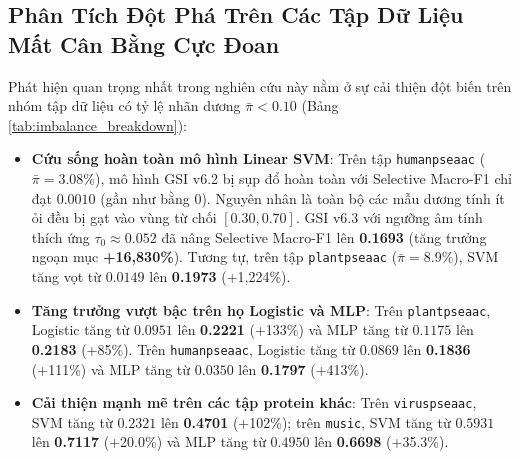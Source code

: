 \documentclass[10pt,a4paper,twoside]{article}
\begin{document}
\subsection{Phân Tích Đột Phá Trên Các Tập Dữ Liệu Mất Cân Bằng Cực Đoan}
Phát hiện quan trọng nhất trong nghiên cứu này nằm ở sự cải thiện đột biến trên nhóm tập dữ liệu có tỷ lệ nhãn dương $\bar{\pi} < 0.10$ (Bảng \ref{tab:imbalance_breakdown}):
\begin{itemize}
    \item \textbf{Cứu sống hoàn toàn mô hình Linear SVM}: Trên tập \texttt{humanpseaac} ($\bar{\pi} = 3.08\%$), mô hình GSI v6.2 bị sụp đổ hoàn toàn với Selective Macro-F1 chỉ đạt $0.0010$ (gần như bằng 0). Nguyên nhân là toàn bộ các mẫu dương tính ít ỏi đều bị gạt vào vùng từ chối $[0.30, 0.70]$. GSI v6.3 với ngưỡng âm tính thích ứng $\tau_0 \approx 0.052$ đã nâng Selective Macro-F1 lên \textbf{0.1693} (tăng trưởng ngoạn mục \textbf{+16,830\%}). Tương tự, trên tập \texttt{plantpseaac} ($\bar{\pi} = 8.9\%$), SVM tăng vọt từ $0.0149$ lên \textbf{0.1973} (+1,224\%).
    \item \textbf{Tăng trưởng vượt bậc trên họ Logistic và MLP}: Trên \texttt{plantpseaac}, Logistic tăng từ $0.0951$ lên \textbf{0.2221} (+133\%) và MLP tăng từ $0.1175$ lên \textbf{0.2183} (+85\%). Trên \texttt{humanpseaac}, Logistic tăng từ $0.0869$ lên \textbf{0.1836} (+111\%) và MLP tăng từ $0.0350$ lên \textbf{0.1797} (+413\%).
    \item \textbf{Cải thiện mạnh mẽ trên các tập protein khác}: Trên \texttt{viruspseaac}, SVM tăng từ $0.2321$ lên \textbf{0.4701} (+102\%); trên \texttt{music}, SVM tăng từ $0.5931$ lên \textbf{0.7117} (+20.0\%) và MLP tăng từ $0.4950$ lên \textbf{0.6698} (+35.3\%).
\end{itemize}

\begin{table}[H]
\centering
\caption{So sánh Selective Macro-F1 và Độ phủ theo Nhóm mức độ Mất cân bằng giữa BR, GSI v6.2 và GSI v6.3.}
\label{tab:imbalance_breakdown}
\end{table}
\end{document}
